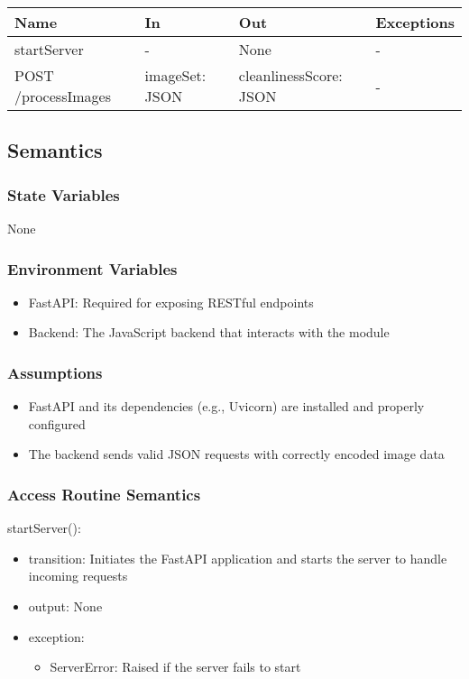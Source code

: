 \documentclass[12pt, titlepage]{article}
\begin{document}
\begin{center}
\begin{tabular}{p{5cm} p{4cm} p{4cm} p{2cm}}
\hline
\textbf{Name} & \textbf{In} & \textbf{Out} & \textbf{Exceptions} \\
\hline
startServer & - & None & - \\
\hline
POST /processImages & imageSet: JSON & cleanlinessScore: JSON & - \\
\hline
\end{tabular}
\end{center}

\subsection{Semantics}

\subsubsection{State Variables}
None


\subsubsection{Environment Variables}
\begin{itemize}
  \item FastAPI: Required for exposing RESTful endpoints
  \item Backend: The JavaScript backend that interacts with the module
\end{itemize}

\subsubsection{Assumptions}
\begin{itemize}
  \item FastAPI and its dependencies (e.g., Uvicorn) are installed and properly configured
  \item The backend sends valid JSON requests with correctly encoded image data
\end{itemize}


\subsubsection{Access Routine Semantics}

\noindent startServer():
\begin{itemize}
\item transition: Initiates the FastAPI application and starts the server to handle incoming requests
\item output: None
\item exception: 
\begin{itemize}
  \item ServerError: Raised if the server fails to start
\end{itemize}

\end{itemize}
\end{document}
